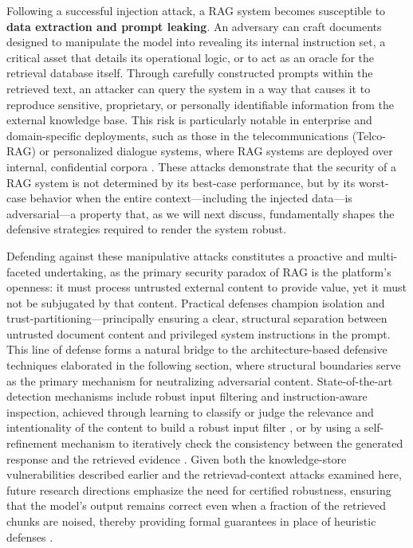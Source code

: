 \documentclass[11pt,a4paper]{article}
\begin{document}
Following a successful injection attack, a RAG system becomes susceptible to \textbf{data extraction and prompt leaking}. An adversary can craft documents designed to manipulate the model into revealing its internal instruction set, a critical asset that details its operational logic, or to act as an oracle for the retrieval database itself. Through carefully constructed prompts within the retrieved text, an attacker can query the system in a way that causes it to reproduce sensitive, proprietary, or personally identifiable information from the external knowledge base. This risk is particularly notable in enterprise and domain-specific deployments, such as those in the telecommunications (Telco-RAG) or personalized dialogue systems, where RAG systems are deployed over internal, confidential corpora \cite{arxiv:2404.15939v3,arxiv:2401.13256v1}. These attacks demonstrate that the security of a RAG system is not determined by its best-case performance, but by its worst-case behavior when the entire context---including the injected data---is adversarial---a property that, as we will next discuss, fundamentally shapes the defensive strategies required to render the system robust.

Defending against these manipulative attacks constitutes a proactive and multi-faceted undertaking, as the primary security paradox of RAG is the platform's openness: it must process untrusted external content to provide value, yet it must not be subjugated by that content. Practical defenses champion isolation and trust-partitioning---principally ensuring a clear, structural separation between untrusted document content and privileged system instructions in the prompt. This line of defense forms a natural bridge to the architecture-based defensive techniques elaborated in the following section, where structural boundaries serve as the primary mechanism for neutralizing adversarial content. State-of-the-art detection mechanisms include robust input filtering and instruction-aware inspection, achieved through learning to classify or judge the relevance and intentionality of the content to build a robust input filter \cite{arxiv:2405.20978v1}, or by using a self-refinement mechanism to iteratively check the consistency between the generated response and the retrieved evidence \cite{arxiv:2401.13256v1}. Given both the knowledge-store vulnerabilities described earlier and the retrievad-context attacks examined here, future research directions emphasize the need for certified robustness, ensuring that the model's output remains correct even when a fraction of the retrieved chunks are noised, thereby providing formal guarantees in place of heuristic defenses \cite{arxiv:2402.03181v3,arxiv:2405.20978v1}.
\end{document}
